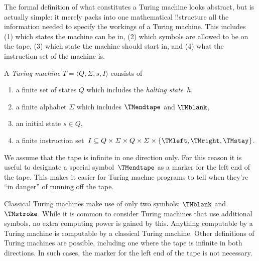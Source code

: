 \documentclass[../../include/open-logic-section]{subfiles}
\begin{document}

\begin{explain}
The formal definition of what constitutes a Turing machine looks
abstract, but is actually simple: it merely packs into one
mathematical !!{structure} all the information needed to specify the
workings of a Turing machine. This includes (1) which states the
machine can be in, (2) which symbols are allowed to be on the tape, (3)
which state the machine should start in, and (4) what the instruction
set of the machine is.
\end{explain}

\begin{defn}
A \emph{Turing machine} $T = \langle Q, \Sigma, s, I\rangle$ consists of
\begin{enumerate}
\item a finite set of states $Q$ which includes the \emph{halting
state}~$h$,
\item a finite alphabet $\Sigma$ which includes $\TMendtape$ and
  $\TMblank$,
\item an initial state $s \in Q$,
\item a finite instruction set~$I \subseteq Q \times \Sigma \times Q
  \times \Sigma \times \{\TMleft, \TMright, \TMstay\}$.
\end{enumerate}
\end{defn}

\begin{explain}
We assume that the tape is infinite in one direction only. For this
reason it is useful to designate a special symbol~$\TMendtape$ as
a marker for the left end of the tape. This makes it easier for
Turing machne programs to tell when they're ``in danger'' of running
off the tape. 

Classical Turing machines make use of only two symbols: $\TMblank$ and
$\TMstroke$. While it is common to consider Turing machines that use additional
symbols, no extra computing power is gained by this. Anything computable by
a Turing machine is computable by a classical Turing machine. Other
definitions of Turing machines are possible,
including one where the tape is infinite in both directions. In such cases,
the marker for the left end of the tape is not necessary.
\end{explain}
\end{document}

